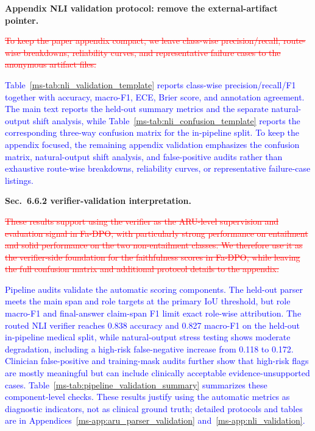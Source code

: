 \documentclass[12pt]{article}
\newcommand{\deleted}[1]{\textcolor{red}{\sout{#1}}}
\newcommand{\added}[1]{\textcolor{blue}{#1}}
\begin{document}
\textbf{Appendix NLI validation protocol: remove the external-artifact pointer.}
\begin{displayquote}
\deleted{To keep the paper appendix compact, we leave class-wise precision/recall, route-wise breakdowns, reliability curves, and representative failure cases to the anonymous artifact files.}

\added{Table~\ref*{ms-tab:nli_validation_template} reports class-wise precision/recall/F1 together with accuracy, macro-F1, ECE, Brier score, and annotation agreement. The main text reports the held-out summary metrics and the separate natural-output shift analysis, while Table~\ref*{ms-tab:nli_confusion_template} reports the corresponding three-way confusion matrix for the in-pipeline split. To keep the appendix focused, the remaining appendix validation emphasizes the confusion matrix, natural-output shift analysis, and false-positive audits rather than exhaustive route-wise breakdowns, reliability curves, or representative failure-case listings.}
\end{displayquote}

\textbf{Sec.~6.6.2 verifier-validation interpretation.}
\begin{displayquote}
\deleted{These results support using the verifier as the ARU-level supervision and evaluation signal in Fa-DPO, with particularly strong performance on entailment and solid performance on the two non-entailment classes. We therefore use it as the verifier-side foundation for the faithfulness scores in Fa-DPO, while leaving the full confusion matrix and additional protocol details to the appendix.}

\added{Pipeline audits validate the automatic scoring components. The held-out parser meets the main span and role targets at the primary IoU threshold, but role macro-F1 and final-answer claim-span F1 limit exact role-wise attribution. The routed NLI verifier reaches 0.838 accuracy and 0.827 macro-F1 on the held-out in-pipeline medical split, while natural-output stress testing shows moderate degradation, including a high-risk false-negative increase from 0.118 to 0.172. Clinician false-positive and training-mask audits further show that high-risk flags are mostly meaningful but can include clinically acceptable evidence-unsupported cases. Table~\ref*{ms-tab:pipeline_validation_summary} summarizes these component-level checks. These results justify using the automatic metrics as diagnostic indicators, not as clinical ground truth; detailed protocols and tables are in Appendices~\ref*{ms-app:aru_parser_validation} and~\ref*{ms-app:nli_validation}.}
\end{displayquote}
\end{document}
